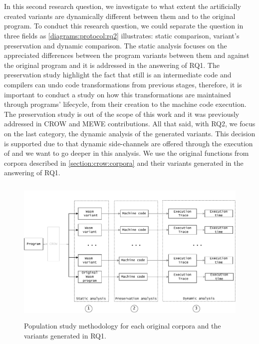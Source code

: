 
\section{\rqtwo}

In this second research question, we investigate to what extent the artificially created variants are dynamically different between them and to the original program. To conduct this research question, we could separate the question in three fields as \autoref{diagrams:protocol:rq2} illustrates: static comparison, variant's preservation and  dynamic comparison. %
The static analysis focuses on the appreciated differences between the program variants between them and against the original program and it is addressed in the answering of RQ1. The preservation study highlight the fact that \wasm still is an intermediate code and compilers can undo code transformations from previous stages, therefore, it is important to conduct a study on how this transformations are maintained through \wasm programs' lifecycle, from their creation to the machine code execution. The preservation study is out of the scope of this work and it was previously addressed in CROW and MEWE contributions.
All that said, with RQ2, we focus on the last category, the dynamic analysis of the generated variants. This decision is supported due to that dynamic side-channels are offered through the execution of \wasm and we want to go deeper in this analysis.
We use the original functions from corpora described in \autoref{section:crow:corpora} and their variants generated in the answering of RQ1. 

\begin{figure}[h]
    \centering
    \includegraphics[height=2.8in]{diagrams/Rq2.pdf}
    \caption{Population study methodology for each original corpora and the variants generated in RQ1.}
    \label{diagrams:protocol:rq2}
\end{figure}

